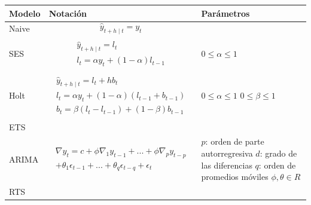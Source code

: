 \begin{table}
	\centering
	\begin{adjustbox}{width=0.95\textwidth}
	\begin{tabular} {m{2cm} m{9cm} m{7cm}}
		\toprule
		\textbf{Modelo} & \textbf{\hspace{3cm}Notación} & \textbf{Parámetros}\\
		\midrule
		Naive&\begin{equation}\label{eqn:1}\hat{y}_{t+h \mid t} = y_{t}\end{equation}	  
		&\\
		SES&	
		\begin{align}
			\label{eqn:2}
			\begin{split}
				\hat{y}_{t+h\mid t} = l_{t}
				\\
				l_{t} = \alpha y_{t}+(1-\alpha)l_{t-1}
			\end{split}
		\end{align}
		& $0 \leq \alpha \leq 1$\\
		Holt 	&	
		\begin{align}
			\label{eqn:3}
			\begin{split}
				\hat{y}_{t+h\mid t} = l_{t}+hb_{t}
				\\
				l_{t} = \alpha y_{t}+(1-\alpha)(l_{t-1}+b_{t-1})
				\\
				b_{t} = \beta(l_{t}-l_{t-1})+(1-\beta)b_{t-1}
			\end{split}
		\end{align}
		& $0 \leq \alpha \leq 1$
		\newline $0 \leq \beta \leq 1$
		\\
		ETS\footnotemark	& &
		\\
		ARIMA 	&	
		\begin{align}
			\label{eqn:4}
			\begin{split}
				\nabla y_{t} = c + \phi \nabla_{1} y_{t-1}+...+\phi \nabla_{p} y_{t-p}\\
				+\theta_{1}\epsilon_{t-1}+...+\theta_{q}\epsilon_{t-q}+\epsilon_{t}
			\end{split}
		\end{align}
		& 
		$p$: orden de parte autorregresiva\newline
		$d$: grado de las diferencias\newline
		$q$: orden de promedios móviles\newline
		$\phi ,\theta\in R$\newline
		\\
		RTS 		&	
		\begin{align}

\end{align}
\end{tabular}
\end{adjustbox}
\end{table}
